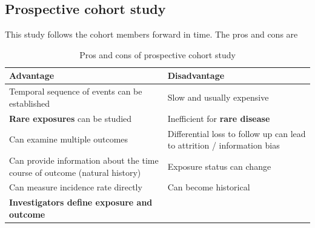 \documentclass{article}
\begin{document}
\subsection{Prospective cohort study}
This study follows the cohort members forward in time. The pros and cons are
\begin{table}[H]
\centering
\begin{tabularx}{\textwidth}{|X|X|}
\hline
\textbf{Advantage} & \textbf{Disadvantage} \\ \hline
Temporal sequence of events can be established  &  Slow and usually expensive \\ \hline
\textbf{Rare exposures} can be studied   & Inefficient for \textbf{rare disease} \\ \hline
Can examine multiple outcomes   & Differential loss to follow up can lead to attrition / information bias \\ \hline
Can provide information about the time course of outcome (natural history) & Exposure status can change \\ \hline
Can measure incidence rate directly & Can become historical \\ \hline
\textbf{Investigators define exposure and outcome} &  \\ \hline
\end{tabularx}
\caption{Pros and cons of prospective cohort study}
\label{tab:pros-cons-prospective-cohort-study}
\end{table}
\end{document}
